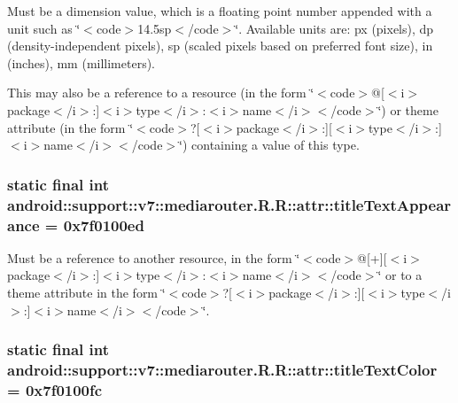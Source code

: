 Must be a dimension value, which is a floating point number appended with a unit such as \char`\"{}$<$code$>$14.5sp$<$/code$>$\char`\"{}. Available units are: px (pixels), dp (density-independent pixels), sp (scaled pixels based on preferred font size), in (inches), mm (millimeters). 

This may also be a reference to a resource (in the form \char`\"{}$<$code$>$@\mbox{[}$<$i$>$package$<$/i$>$:\mbox{]}$<$i$>$type$<$/i$>$:$<$i$>$name$<$/i$>$$<$/code$>$\char`\"{}) or theme attribute (in the form \char`\"{}$<$code$>$?\mbox{[}$<$i$>$package$<$/i$>$:\mbox{]}\mbox{[}$<$i$>$type$<$/i$>$:\mbox{]}$<$i$>$name$<$/i$>$$<$/code$>$\char`\"{}) containing a value of this type. \hypertarget{classandroid_1_1support_1_1v7_1_1mediarouter_1_1_r_1_1attr_22b5bdaf6e9910f8cbe61d068b2c3ed6}{
\subsubsection[{titleTextAppearance}]{\setlength{\rightskip}{0pt plus 5cm}static final int android::support::v7::mediarouter.R.R::attr::titleTextAppearance = 0x7f0100ed}}
\label{classandroid_1_1support_1_1v7_1_1mediarouter_1_1_r_1_1attr_22b5bdaf6e9910f8cbe61d068b2c3ed6}


Must be a reference to another resource, in the form \char`\"{}$<$code$>$@\mbox{[}+\mbox{]}\mbox{[}$<$i$>$package$<$/i$>$:\mbox{]}$<$i$>$type$<$/i$>$:$<$i$>$name$<$/i$>$$<$/code$>$\char`\"{} or to a theme attribute in the form \char`\"{}$<$code$>$?\mbox{[}$<$i$>$package$<$/i$>$:\mbox{]}\mbox{[}$<$i$>$type$<$/i$>$:\mbox{]}$<$i$>$name$<$/i$>$$<$/code$>$\char`\"{}. \hypertarget{classandroid_1_1support_1_1v7_1_1mediarouter_1_1_r_1_1attr_a6c2b773de5d91f54bb8a21638066678}{
\subsubsection[{titleTextColor}]{\setlength{\rightskip}{0pt plus 5cm}static final int android::support::v7::mediarouter.R.R::attr::titleTextColor = 0x7f0100fc}}
\label{classandroid_1_1support_1_1v7_1_1mediarouter_1_1_r_1_1attr_a6c2b773de5d91f54bb8a21638066678}


